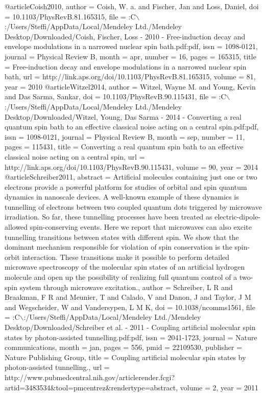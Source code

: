 @article{Coish2010,
author = {Coish, W. a. and Fischer, Jan and Loss, Daniel},
doi = {10.1103/PhysRevB.81.165315},
file = {:C$\backslash$:/Users/Steffi/AppData/Local/Mendeley Ltd./Mendeley Desktop/Downloaded/Coish, Fischer, Loss - 2010 - Free-induction decay and envelope modulations in a narrowed nuclear spin bath.pdf:pdf},
issn = {1098-0121},
journal = {Physical Review B},
month = {apr},
number = {16},
pages = {165315},
title = {{Free-induction decay and envelope modulations in a narrowed nuclear spin bath}},
url = {http://link.aps.org/doi/10.1103/PhysRevB.81.165315},
volume = {81},
year = {2010}
}
@article{Witzel2014,
author = {Witzel, Wayne M. and Young, Kevin and {Das Sarma}, Sankar},
doi = {10.1103/PhysRevB.90.115431},
file = {:C$\backslash$:/Users/Steffi/AppData/Local/Mendeley Ltd./Mendeley Desktop/Downloaded/Witzel, Young, Das Sarma - 2014 - Converting a real quantum spin bath to an effective classical noise acting on a central spin.pdf:pdf},
issn = {1098-0121},
journal = {Physical Review B},
month = {sep},
number = {11},
pages = {115431},
title = {{Converting a real quantum spin bath to an effective classical noise acting on a central spin}},
url = {http://link.aps.org/doi/10.1103/PhysRevB.90.115431},
volume = {90},
year = {2014}
}
@article{Schreiber2011,
abstract = {Artificial molecules containing just one or two electrons provide a powerful platform for studies of orbital and spin quantum dynamics in nanoscale devices. A well-known example of these dynamics is tunnelling of electrons between two coupled quantum dots triggered by microwave irradiation. So far, these tunnelling processes have been treated as electric-dipole-allowed spin-conserving events. Here we report that microwaves can also excite tunnelling transitions between states with different spin. We show that the dominant mechanism responsible for violation of spin conservation is the spin-orbit interaction. These transitions make it possible to perform detailed microwave spectroscopy of the molecular spin states of an artificial hydrogen molecule and open up the possibility of realizing full quantum control of a two-spin system through microwave excitation.},
author = {Schreiber, L R and Braakman, F R and Meunier, T and Calado, V and Danon, J and Taylor, J M and Wegscheider, W and Vandersypen, L M K},
doi = {10.1038/ncomms1561},
file = {:C$\backslash$:/Users/Steffi/AppData/Local/Mendeley Ltd./Mendeley Desktop/Downloaded/Schreiber et al. - 2011 - Coupling artificial molecular spin states by photon-assisted tunnelling.pdf:pdf},
issn = {2041-1723},
journal = {Nature communications},
month = {jan},
pages = {556},
pmid = {22109530},
publisher = {Nature Publishing Group},
title = {{Coupling artificial molecular spin states by photon-assisted tunnelling.}},
url = {http://www.pubmedcentral.nih.gov/articlerender.fcgi?artid=3483534{\&}tool=pmcentrez{\&}rendertype=abstract},
volume = {2},
year = {2011}
}
